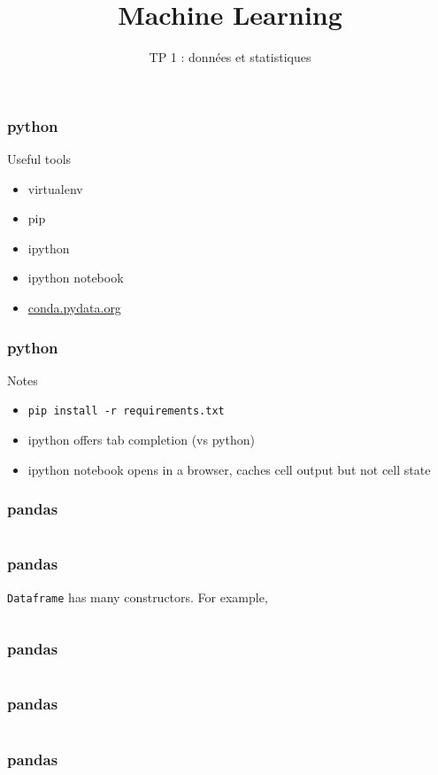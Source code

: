 \documentclass{formation}
\title{Machine Learning}
\subtitle{TP 1 : données et statistiques}
\begin{document}
\maketitle

\begin{frame}
  \frametitle{python}
  Useful tools
  \begin{itemize}
  \item virtualenv
  \item pip
  \item ipython
  \item ipython notebook
  \item \url{conda.pydata.org}
  \end{itemize}
\end{frame}

\begin{frame}
  \frametitle{python}
  Notes
  \begin{itemize}
    \item \texttt{pip install -r requirements.txt}
    \item ipython offers tab completion (vs python)
    \item ipython notebook opens in a browser, caches cell output but not cell state
  \end{itemize}
\end{frame}

\begin{frame}
  \frametitle{pandas}
  \inputminted{python}{/home/fmg/formations-code-illustration/pandas_1.py}
\end{frame}

\begin{frame}
  \frametitle{pandas}
  \texttt{Dataframe} has many constructors.  For example,
  \inputminted[linenos,fontsize=\small]{python}{/home/fmg/formations-code-illustration/pandas_2.py}
\end{frame}

\begin{frame}
  \frametitle{pandas}
  \inputminted[linenos,fontsize=\small]{python}{/home/fmg/formations-code-illustration/pandas_3.py}
\end{frame}

\begin{frame}
  \frametitle{pandas}
  \inputminted[linenos,fontsize=\small]{python}{/home/fmg/formations-code-illustration/pandas_4.py}
\end{frame}

\begin{frame}
  \frametitle{pandas}
  \inputminted[linenos,fontsize=\small]{python}{/home/fmg/formations-code-illustration/pandas_5.py}
\end{frame}
\end{document}
